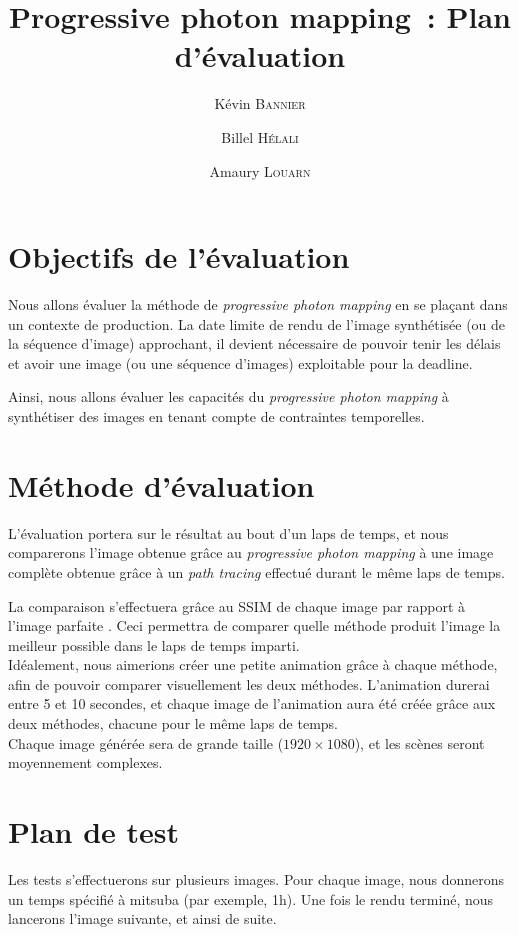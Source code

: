 \documentclass[a4paper]{article}
\title{Progressive photon mapping~: Plan d'évaluation}
\author{Kévin \textsc{Bannier} \and Billel \textsc{Hélali} \and Amaury \textsc{Louarn}}
\begin{document}
\maketitle

\section{Objectifs de l'évaluation}
Nous allons évaluer la méthode de \emph{progressive photon mapping} en se plaçant dans un contexte de production. La date limite de rendu de l'image synthétisée (ou de la séquence d'image) approchant, il devient nécessaire de pouvoir tenir les délais et avoir une image (ou une séquence d'images) exploitable pour la deadline.

Ainsi, nous allons évaluer les capacités du \emph{progressive photon mapping} à synthétiser des images en tenant compte de contraintes temporelles.

\section{Méthode d'évaluation}
L'évaluation portera sur le résultat au bout d'un laps de temps, et nous comparerons l'image obtenue grâce au \emph{progressive photon mapping} à une image complète obtenue grâce à un \emph{path tracing} effectué durant le même laps de temps.

La comparaison s'effectuera grâce au SSIM de chaque image par rapport à l'image \og parfaite \fg. Ceci permettra de comparer quelle méthode produit l'image la meilleur possible dans le laps de temps imparti.\\

Idéalement, nous aimerions créer une petite animation grâce à chaque méthode, afin de pouvoir comparer visuellement les deux méthodes. L'animation durerai entre 5 et 10 secondes, et chaque image de l'animation aura été créée grâce aux deux méthodes, chacune pour le même laps de temps.\\

Chaque image générée sera de grande taille ($1920 \times 1080$), et les scènes seront moyennement complexes.

\section{Plan de test}
Les tests s'effectuerons sur plusieurs images. Pour chaque image, nous donnerons un temps spécifié à mitsuba (par exemple, 1h). Une fois le rendu terminé, nous lancerons l'image suivante, et ainsi de suite.
\end{document}
